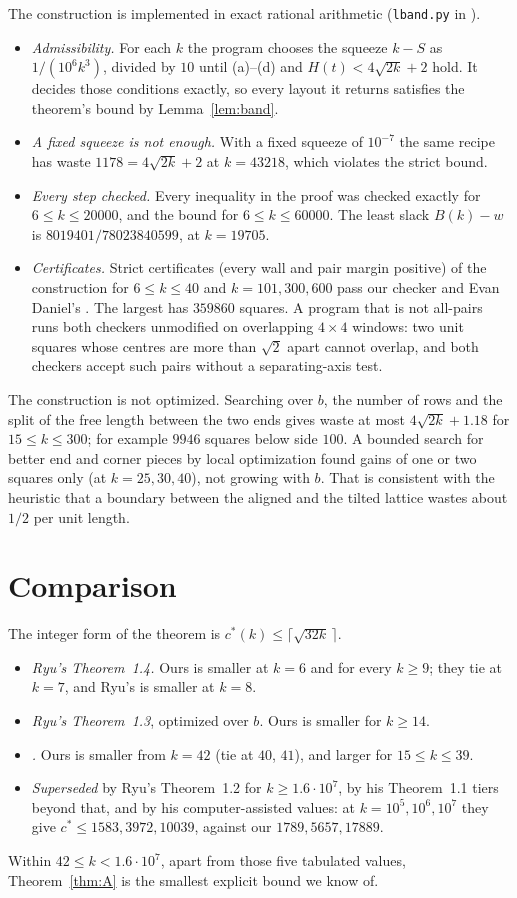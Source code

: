 \documentclass[11pt,letterpaper]{amsart}
\theoremstyle{plain}
\theoremstyle{remark}
\newcommand{\cs}{c^{*}}
\begin{document}
The construction is implemented in exact rational arithmetic (\texttt{lband.py} in \cite{Fan26b}).
\begin{itemize}
\item \emph{Admissibility.} For each $k$ the program chooses the squeeze $k-S$ as $1/(10^6k^3)$, divided by $10$ until (a)--(d) and $H(t)<4\sqrt{2k}+2$ hold. It decides those conditions exactly, so every layout it returns satisfies the theorem's bound by Lemma~\ref{lem:band}.
\item \emph{A fixed squeeze is not enough.} With a fixed squeeze of $10^{-7}$ the same recipe has waste $1178=4\sqrt{2k}+2$ at $k=43218$, which violates the strict bound.
\item \emph{Every step checked.} Every inequality in the proof was checked exactly for $6\le k\le20000$, and the bound for $6\le k\le60000$. The least slack $B(k)-w$ is $8019401/78023840599$, at $k=19705$.
\item \emph{Certificates.} Strict certificates (every wall and pair margin positive) of the construction for $6\le k\le40$ and $k=101,300,600$ pass our checker and Evan Daniel's \cite{Dan26}. The largest has $359860$ squares. A program that is not all-pairs runs both checkers unmodified on overlapping $4\times4$ windows: two unit squares whose centres are more than $\sqrt2$ apart cannot overlap, and both checkers accept such pairs without a separating-axis test.
\end{itemize}

The construction is not optimized. Searching over $b$, the number of rows and the split of the free length between the two ends gives waste at most $4\sqrt{2k}+1.18$ for $15\le k\le300$; for example $9946$ squares below side $100$. A bounded search for better end and corner pieces by local optimization found gains of one or two squares only (at $k=25,30,40$), not growing with $b$. That is consistent with the heuristic that a boundary between the aligned and the tilted lattice wastes about $1/2$ per unit length.

\section{Comparison}

The integer form of the theorem is $\cs(k)\le\lceil\sqrt{32k}\,\rceil$.
\begin{itemize}
\item \emph{Ryu's Theorem~1.4.} Ours is smaller at $k=6$ and for every $k\ge9$; they tie at $k=7$, and Ryu's is smaller at $k=8$.
\item \emph{Ryu's Theorem~1.3}, optimized over $b$. Ours is smaller for $k\ge14$.
\item \emph{\cite{Fan26a}.} Ours is smaller from $k=42$ (tie at $40$, $41$), and larger for $15\le k\le39$.
\item \emph{Superseded} by Ryu's Theorem~1.2 for $k\ge1.6\cdot10^7$, by his Theorem~1.1 tiers beyond that, and by his computer-assisted values: at $k=10^5,10^6,10^7$ they give $\cs\le1583,3972,10039$, against our $1789,5657,17889$.
\end{itemize}
Within $42\le k<1.6\cdot10^7$, apart from those five tabulated values, Theorem~\ref{thm:A} is the smallest explicit bound we know of.
\end{document}
